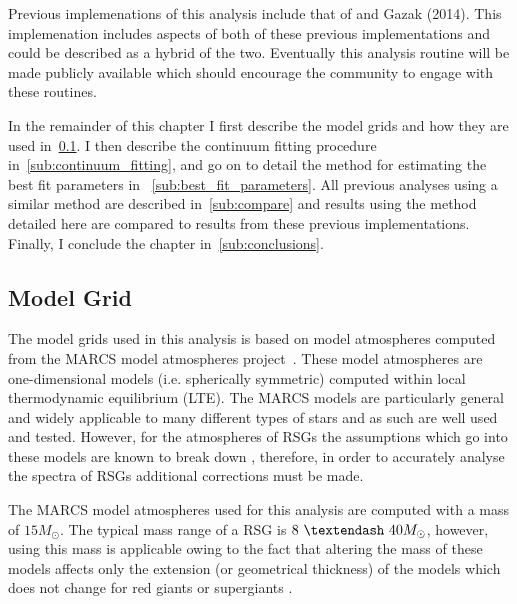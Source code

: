 \documentclass[12pt]{article}
\begin{document}
Previous implemenations of this analysis include that of
\cite{2010MNRAS.407.1203D} and Gazak (2014).
This implemenation includes aspects of both of these previous implementations and could be described as a hybrid of the two.
Eventually this analysis routine will be made publicly available which should encourage the community to engage with these routines.

In the remainder of this chapter I first describe the model grids and how they are used in~\ref{sub:model_grid}.
I then describe the continuum fitting procedure in~\ref{sub:continuum_fitting},
and go on to detail the method for estimating the best fit parameters in
~\ref{sub:best_fit_parameters}.
All previous analyses using a similar method are described in~\ref{sub:compare}
and results using the method detailed here are compared to results from these previous implementations.
Finally, I conclude the chapter in~\ref{sub:conclusions}.


\subsection{Model Grid} %
\label{sub:model_grid}
The model grids used in this analysis is based on model atmospheres computed from the
MARCS model atmospheres project~\citep{2008A&A...486..951G}.
These model atmospheres are one-dimensional models (i.e. spherically symmetric)
computed within local thermodynamic equilibrium (LTE).
The MARCS models are particularly general and widely applicable to many different types of stars and as such are well used and tested.
However, for the atmospheres of RSGs the assumptions which go into these models are known to break down
\citep{2002AN....323..213F,2010ASPC..425..124P},
therefore, in order to accurately analyse the spectra of RSGs additional corrections must be made.

The MARCS model atmospheres used for this analysis are computed with a mass of $15M_{\odot}$.
The typical mass range of a RSG is $8~\textendash~40M_{\odot}$, however,
using this mass is applicable owing to the fact that altering the mass of these models affects only the extension
(or geometrical thickness) of the models which does not change for red giants or supergiants
\citep{2010MNRAS.407.1203D}.
\end{document}
